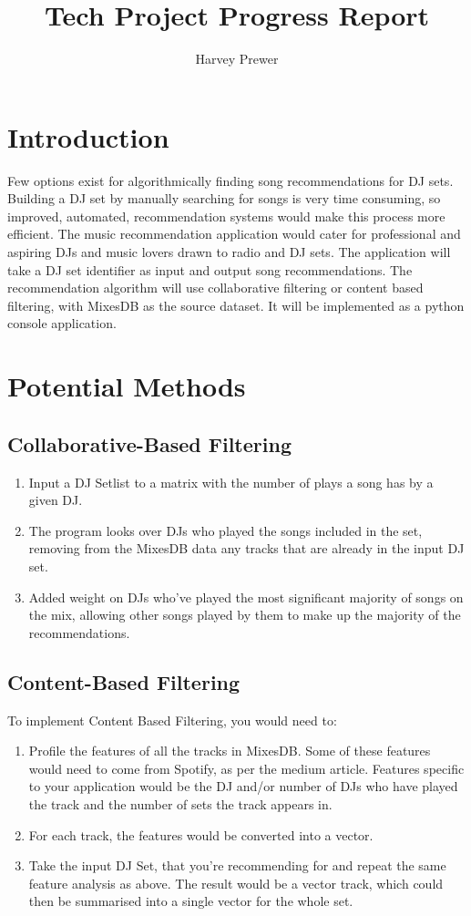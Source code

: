 \documentclass[]{article}
\title{Tech Project Progress Report}
\author{Harvey Prewer}
\begin{document}
\maketitle


\section{Introduction}
	 Few options exist for algorithmically finding song recommendations for DJ sets. Building a DJ set by manually searching for songs is very time consuming, so improved, automated, recommendation systems would make this process more efficient. 
	 The music recommendation application would cater for professional and aspiring DJs and music lovers drawn to radio and DJ sets. The application will take a DJ set identifier as input and output song recommendations. The recommendation algorithm will use collaborative filtering or content based filtering, with MixesDB as the source dataset. It will be  implemented as a python console application.
\section{Potential Methods}
	 \subsection{Collaborative-Based Filtering}
	 \begin{enumerate}
	 	\item  Input a DJ Setlist to a matrix with the number of plays a song has by a given DJ.
	 	\item The program looks over DJs who played the songs included in the set, removing from the MixesDB data any tracks that are already in the input DJ set.
	 	\item Added weight on DJs who've played the most significant majority of songs on the mix, allowing other songs played by them to make up the majority of the recommendations.
	 \end{enumerate}
  \subsection{Content-Based Filtering}
  To implement Content Based Filtering, you would need to:
 \begin{enumerate}
 	\item  Profile the features of all the tracks in MixesDB. Some of these features would need to come from Spotify, as per the medium article. Features specific to your application would be the DJ and/or number of DJs who have played the track and the number of sets the track appears in.
 	\item For each track, the features would be converted into a vector.
 	\item Take the input DJ Set, that you're recommending for and repeat the same feature analysis as above. The result would be a vector track, which could then be summarised into a single vector for the whole set.
 \end{enumerate}
\end{document}
